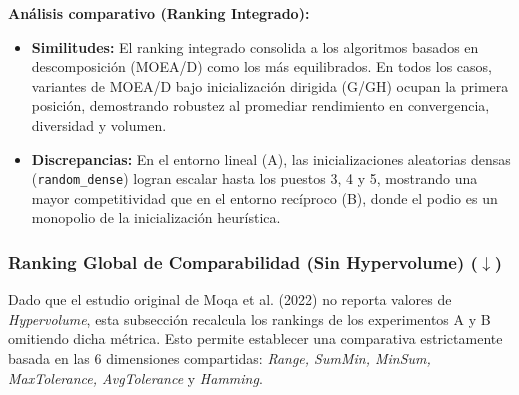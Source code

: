 \documentclass[a4paper,10pt]{article}
\begin{document}
\textbf{Análisis comparativo (Ranking Integrado):}
\begin{itemize}
    \item \textbf{Similitudes:} El ranking integrado consolida a los algoritmos basados en descomposición (MOEA/D) como los más equilibrados. En todos los casos, variantes de MOEA/D bajo inicialización dirigida (G/GH) ocupan la primera posición, demostrando robustez al promediar rendimiento en convergencia, diversidad y volumen.
    \item \textbf{Discrepancias:} En el entorno lineal (A), las inicializaciones aleatorias densas (\texttt{random\_dense}) logran escalar hasta los puestos 3, 4 y 5, mostrando una mayor competitividad que en el entorno recíproco (B), donde el podio es un monopolio de la inicialización heurística.
\end{itemize}

\subsubsection{Ranking Global de Comparabilidad (Sin Hypervolume) \texorpdfstring{($\downarrow$)}{(down)}}

Dado que el estudio original de Moqa et al. (2022) no reporta valores de \textit{Hypervolume}, esta subsección recalcula los rankings de los experimentos A y B omitiendo dicha métrica. Esto permite establecer una comparativa estrictamente basada en las 6 dimensiones compartidas: \textit{Range, SumMin, MinSum, MaxTolerance, AvgTolerance} y \textit{Hamming}.
\end{document}
